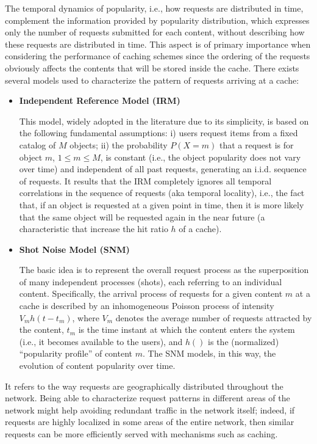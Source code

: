 \documentclass[10pt]{article}
\newcommand{\fakeacmpar}[1]{\vspace{2 mm}\noindent{\textbf{#1.}}}
\begin{document}
\fakeacmpar{Temporal Locality}
The temporal dynamics of popularity, i.e., how requests are distributed in time, complement the information provided by popularity distribution, which expresses only the number of requests submitted for each content, without describing how these requests are distributed in time. This aspect is of primary importance when considering the performance of caching schemes since the ordering of the requests obviously affects the contents that will be stored inside the cache. 
There exists several models used to characterize the pattern of requests arriving at a cache:
\begin{itemize}
\item \textbf{Independent Reference Model (IRM)}

This model, widely adopted in the literature due to its simplicity, is based on the following fundamental assumptions: i) users request items from a fixed catalog of $M$ objects; ii) the probability $P(X=m)$ that a request is for object $m$, $1 \le m \le M$, is constant (i.e., the object popularity does not vary over time) and independent of all past requests, generating an i.i.d. sequence of requests.
It results that the IRM completely ignores all temporal correlations in the sequence of requests (aka temporal locality), i.e., the fact that, if an object is requested at a given point in time, then it is more likely that the same object will be requested again in the near future (a characteristic that increase the hit ratio $h$ of a cache).

\item \textbf{Shot Noise Model (SNM) \cite{garetto15infocom}}

The basic idea is to represent the overall request process as the superposition of many independent processes (shots), each referring to an individual content. Specifically, the arrival process of requests for a given content $m$ at a cache is described by an inhomogeneous Poisson process of intensity $V_m h(t - t_m)$, where $V_m$ denotes the average number of requests attracted by the content, $t_m$ is the time instant at which the content enters the system (i.e., it becomes available to the users), and $h()$ is the (normalized) ``popularity profile'' of content $m$. The SNM models, in this way, the evolution of content popularity over time.
\end{itemize}

\fakeacmpar{Spatial Locality}
It refers to the way requests are geographically distributed throughout the network. 
Being able to characterize request patterns in different areas of the network might help avoiding redundant traffic in the network itself; indeed, if requests are highly localized in some areas of the entire network, then similar requests can be more efficiently served with mechanisms such as caching.
\end{document}
